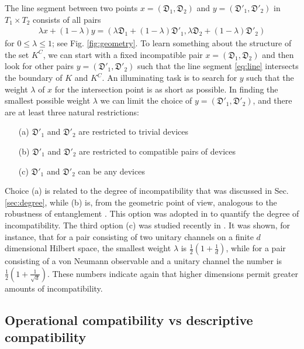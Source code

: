 \documentclass[12pt]{iopart}
\theoremstyle{definition}
\newcommand{\half}{\tfrac{1}{2}} %
\newcommand{\Dev}{\mathfrak{D}} %
\begin{document}
The line segment between two points $x=(\Dev_1,\Dev_2)$ and $y=(\Dev'_1,\Dev'_2)$ in $T_1\times T_2$ consists of all pairs 
\begin{align}\label{eq:line}
\lambda x + (1-\lambda) y = (\lambda \Dev_1 + (1-\lambda) \Dev'_1,\lambda \Dev_2 + (1-\lambda) \Dev'_2) 
\end{align}
for $0\leq\lambda\leq 1$; see Fig. \ref{fig:geometry}.
To learn something about the structure of the set $K^C$, we can start with a fixed incompatible pair $x=(\Dev_1,\Dev_2)$ and then look for other pairs $y=(\Dev'_1,\Dev'_2)$ such that the line segment \eqref{eq:line} intersects the boundary of $K$ and $K^C$.
An illuminating task is to search for $y$ such that the weight $\lambda$ of $x$ for the intersection point is as short as possible. 
In finding the smallest possible weight $\lambda$ we can limit the choice of $y=(\Dev'_1,\Dev'_2)$, and there are at least three natural restrictions:
\begin{itemize}
\item[(a)] $\Dev'_1$ and $\Dev'_2$ are restricted to trivial devices
\item[(b)] $\Dev'_1$ and $\Dev'_2$ are restricted to compatible pairs of devices
\item[(c)] $\Dev'_1$ and $\Dev'_2$ can be any devices
\end{itemize}
Choice (a) is related to the degree of incompatibility that was discussed in Sec. \ref{sec:degree}, while (b) is, from the geometric point of view, analogous to the robustness of entanglement \cite{ViTa99}. 
This option was adopted in \cite{MaAcGi06} to quantify the degree of incompatibility.  
The third option (c) was studied recently in \cite{Haapasalo15}.
It was shown, for instance, that for a pair consisting of two unitary channels on a finite $d$ dimensional Hilbert space, the smallest weight $\lambda$ is
$\half \left( 1 + \frac{1}{d} \right)$,
while for a pair consisting of a von Neumann observable and a unitary channel the number is $\half \left( 1 + \frac{1}{\sqrt{d}} \right)$.
These numbers indicate again that higher dimensions permit greater amounts of incompatibility.  

\subsection{Operational compatibility vs descriptive compatibility}
\end{document}
